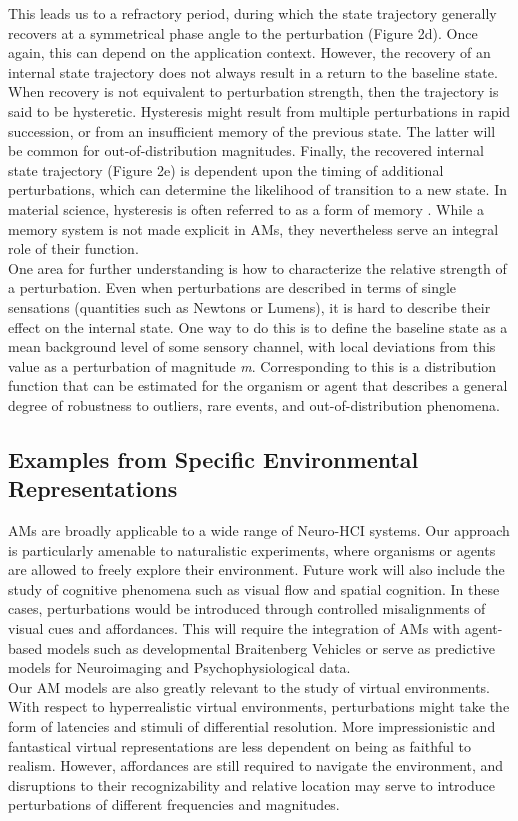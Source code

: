 \documentclass{sigchi}
\begin{document}
This leads us to a refractory period, during which the state trajectory generally recovers at a symmetrical phase angle to the perturbation (Figure 2d). Once again, this can depend on the application context. However, the recovery of an internal state trajectory does not always result in a return to the baseline state. When recovery is not equivalent to perturbation strength, then the trajectory is said to be hysteretic. Hysteresis might result from multiple perturbations in rapid succession, or from an insufficient memory of the previous state. The latter will be common for out-of-distribution magnitudes. Finally, the recovered internal state trajectory (Figure 2e) is dependent upon the timing of additional perturbations, which can determine the likelihood of transition to a new state. In material science, hysteresis is often referred to as a form of memory \cite{ortin}. While a memory system is not made explicit in AMs, they nevertheless serve an integral role of their function.\\
One area for further understanding is how to characterize the relative strength of a perturbation. Even when perturbations are described in terms of single sensations (quantities such as Newtons or Lumens), it is hard to describe their effect on the internal state. One way to do this is to define the baseline state as a mean background level of some sensory channel, with local deviations from this value as a perturbation of magnitude \textit{m}. Corresponding to this is a distribution function that can be estimated for the organism or agent that describes a general degree of robustness to outliers, rare events, and out-of-distribution phenomena.


\subsection{Examples from Specific Environmental Representations}
AMs are broadly applicable to a wide range of Neuro-HCI systems. Our approach is particularly amenable to naturalistic experiments, where organisms or agents are allowed to freely explore their environment. Future work will also include the study of cognitive phenomena such as visual flow and spatial cognition. In these cases, perturbations would be introduced through controlled misalignments of visual cues and affordances. This will require the integration of AMs with agent-based models such as developmental Braitenberg Vehicles \cite{bradly_categories} or serve as predictive models for Neuroimaging and Psychophysiological data. \\
Our AM models are also greatly relevant to the study of virtual environments. With respect to hyperrealistic virtual environments, perturbations might take the form of latencies and stimuli of differential resolution. More impressionistic and fantastical virtual representations are less dependent on being as faithful to realism. However, affordances are still required to navigate the environment, and disruptions to their recognizability and relative location may serve to introduce perturbations of different frequencies and magnitudes. 
\end{document}

